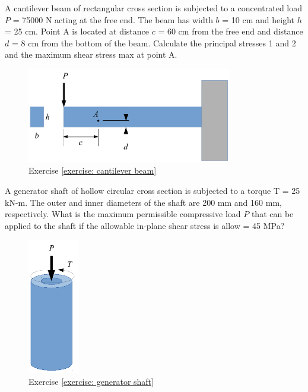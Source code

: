 \documentclass[
fontsize=10pt,
a4paper,
twosides=false,
open=any,
svgnames,
]{kaobook} %
\begin{document}
\begin{exercises}

  \item \label{exercise: cantilever beam} A cantilever beam of rectangular cross section is subjected to a concentrated load $P$ = 75000 N acting at the free end. The beam has width $b$ = 10 cm and height $h$ = 25 cm. Point A is located at distance $c$ = 60 cm from the free end and distance $d$ = 8 cm from the bottom of the beam. Calculate the principal stresses 1 and 2 and the maximum shear stress max at point A.
  \begin{figure}[h]
    \centering
    \includegraphics[width=0.8\textwidth]{pictures/Static-body-load-analysis/multiaxial-cantilever-beam-exercise}
    \caption{Exercise \ref{exercise: cantilever beam}}
  \end{figure}
  
  \item \label{exercise: generator shaft}A generator shaft of hollow circular cross section is subjected to a torque T = 25 kN-m. The outer and inner diameters of the shaft are 200 mm and 160 mm, respectively. What is the maximum permissible compressive load $P$ that can be applied to the shaft if the allowable in-plane shear stress is allow = 45 MPa?
  
  \begin{figure}[h]
    \centering
    \includegraphics[width=0.2\textwidth]{pictures/Static-body-load-analysis/multiaxial-generator-shaft-exercise}
    \caption{Exercise \ref{exercise: generator shaft}}
  \end{figure}
  

\end{exercises}
\end{document}
